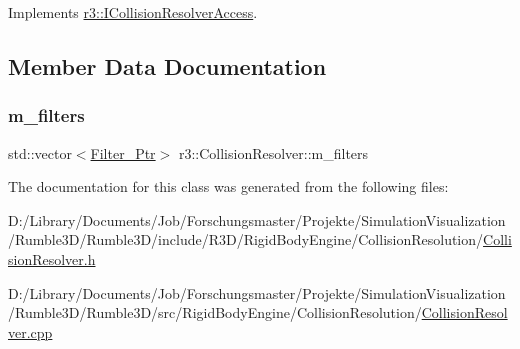 Implements \mbox{\hyperlink{classr3_1_1_i_collision_resolver_access_a266dfbc4c421a7c3429ef474d63fd941}{r3\+::\+I\+Collision\+Resolver\+Access}}.



\subsection{Member Data Documentation}
\mbox{\label{classr3_1_1_collision_resolver_abf1234ad45ba7f114b31950c90ccaaff}} 
\subsubsection{\texorpdfstring{m\+\_\+filters}{m\_filters}}
{\footnotesize\ttfamily std\+::vector$<$\mbox{\hyperlink{classr3_1_1_collision_resolver_a5b3838b81de7909c3c78268801d61414}{Filter\+\_\+\+Ptr}}$>$ r3\+::\+Collision\+Resolver\+::m\+\_\+filters\hspace{0.3cm}{\ttfamily [protected]}}



The documentation for this class was generated from the following files\+:\begin{DoxyCompactItemize}
\item 
D\+:/\+Library/\+Documents/\+Job/\+Forschungsmaster/\+Projekte/\+Simulation\+Visualization/\+Rumble3\+D/\+Rumble3\+D/include/\+R3\+D/\+Rigid\+Body\+Engine/\+Collision\+Resolution/\mbox{\hyperlink{_collision_resolver_8h}{Collision\+Resolver.\+h}}\item 
D\+:/\+Library/\+Documents/\+Job/\+Forschungsmaster/\+Projekte/\+Simulation\+Visualization/\+Rumble3\+D/\+Rumble3\+D/src/\+Rigid\+Body\+Engine/\+Collision\+Resolution/\mbox{\hyperlink{_collision_resolver_8cpp}{Collision\+Resolver.\+cpp}}\end{DoxyCompactItemize}
